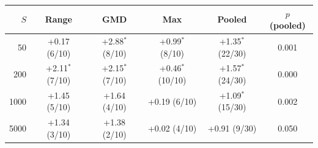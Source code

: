\begin{tabular}{rccccc}
\toprule
$S$ & Range & GMD & Max & Pooled & $p$ (pooled) \\
\midrule
50 & +0.17 (6/10) & +2.88$^\ast$ (8/10) & +0.99$^\ast$ (8/10) & +1.35$^\ast$ (22/30) & 0.001 \\
200 & +2.11$^\ast$ (7/10) & +2.15$^\ast$ (7/10) & +0.46$^\ast$ (10/10) & +1.57$^\ast$ (24/30) & 0.000 \\
1000 & +1.45 (5/10) & +1.64 (4/10) & +0.19 (6/10) & +1.09$^\ast$ (15/30) & 0.002 \\
5000 & +1.34 (3/10) & +1.38 (2/10) & +0.02 (4/10) & +0.91 (9/30) & 0.050 \\
\bottomrule
\end{tabular}
